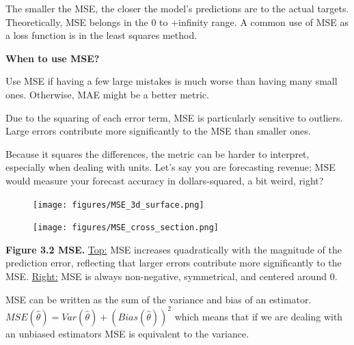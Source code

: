 The smaller the MSE, the closer the model's predictions are to the actual targets. Theoretically, MSE belongs in the 0 to +infinity range.
A common use of MSE as a loss function is in the least squares method.

\textbf{When to use MSE?}

Use MSE if having a few large mistakes is much worse than having many small ones. Otherwise, MAE might be a better metric.

{
    \item Due to the squaring of each error term, MSE is particularly sensitive to outliers. Large errors contribute more significantly to the MSE than smaller ones.
    \item Because it squares the differences, the metric can be harder to interpret, especially when dealing with units.
    Let's say you are forecasting revenue; MSE would measure your forecast accuracy in dollars-squared, a bit weird, right?
}

\clearpage

\thispagestyle{customstyle}

\begin{figure}[ht!]
    \centering
    \texttt{[image: figures/MSE\_3d\_surface.png]}
\end{figure}

\begin{figure}
    \centering
    \vspace{-10pt} %
    \texttt{[image: figures/MSE\_cross\_section.png]} %
    \vspace{-10pt} %
\end{figure}

\textbf{Figure 3.2 MSE.} \underline{Top:} MSE increases quadratically with the magnitude of the prediction error,
reflecting that larger errors contribute more significantly to the MSE.
\underline{Right:} MSE is always non-negative, symmetrical, and centered around 0.

{MSE can be written as the sum of the variance and bias of an estimator. $MSE(\hat{\theta}) = Var(\hat{\theta}) + \left(Bias(\hat{\theta})\right)^2$ which means
that if we are dealing with an unbiased estimators MSE is equivalent to the variance.}

